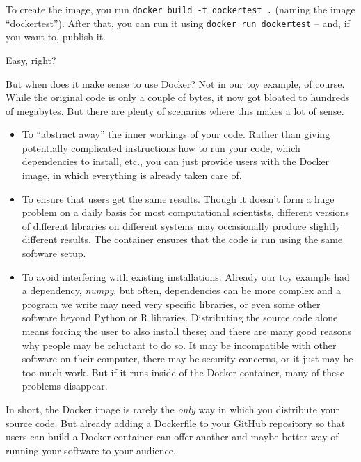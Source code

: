 To create the image, you run \verb|docker build -t dockertest .| (naming
the image ``dockertest''). After that, you can run
it using \verb|docker run dockertest| -- and, if you want to, publish it.

Easy, right?

But when does it make sense to use Docker? Not in our toy example,
of course. While the original code is only a couple of bytes, it now
got bloated to hundreds of megabytes. But there are plenty of
scenarios where this makes a lot of sense.

\begin{itemize}
\item To ``abstract away'' the inner workings of your code. Rather than giving potentially complicated instructions how to run your code, which dependencies to install, etc., you can just provide users with the Docker image, in which everything is already taken care of.
\item To ensure that users get the same results. Though it doesn't form a huge problem on a daily basis for most computational scientists, different versions of different libraries on different systems may occasionally produce slightly different results. The container ensures that the code is run using the same software setup.
\item To avoid interfering with existing installations. Already our toy example had a dependency, \emph{numpy}, but often, dependencies can be more complex and a program we write may need very specific libraries, or even some other software beyond Python or R libraries. Distributing the source code alone means forcing the user to also install these; and there are many good reasons why people may be reluctant to do so. It may be incompatible with other software on their computer, there may be security concerns, or it just may be too much work. But if it runs inside of the Docker container, many of these problems disappear.
\end{itemize}

In short, the Docker image is rarely the \emph{only} way in which you distribute your source code. But already adding a Dockerfile to your GitHub repository so that users can build a Docker container can offer another and maybe better way of running your software to your audience.

